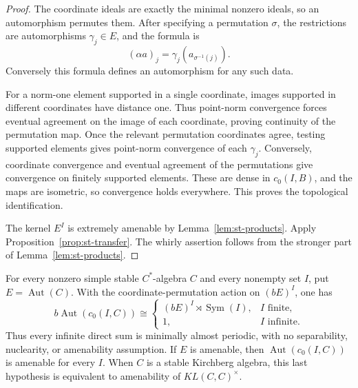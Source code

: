 \begin{proof}
The coordinate ideals are exactly the minimal nonzero ideals, so an
automorphism permutes them. After specifying a permutation $\sigma$, the
restrictions are automorphisms $\gamma_j\in E$, and the formula is 
\begin{equation}  \label{eq:st-sum-action}
(\alpha a)_j=\gamma_j(a_{\sigma^{-1}(j)}).
\end{equation}
Conversely this formula defines an automorphism for any such data.

For a norm-one element supported in a single coordinate, images supported in
different coordinates have distance one. Thus point-norm convergence forces
eventual agreement on the image of each coordinate, proving continuity of
the permutation map. Once the relevant permutation coordinates agree,
testing supported elements gives point-norm convergence of each $\gamma_j$.
Conversely, coordinate convergence and eventual agreement of the
permutations give convergence on finitely supported elements. These are
dense in $c_0(I,B)$, and the maps are isometric, so convergence holds
everywhere. This proves the topological identification.

The kernel $E^I$ is extremely amenable by Lemma~\ref{lem:st-products}. Apply
Proposition~\ref{prop:st-transfer}.
The whirly assertion follows from the stronger part of Lemma~\ref{lem:st-products}.
\end{proof}

\begin{corollary}\label{cor:st-direct-sum-bohr-general}
 For every nonzero simple stable $C^*$-algebra $C
$ and every nonempty set $I$, put $E=\operatorname{Aut}(C)$. With the
coordinate-permutation action on $(bE)^I$, one has 
\begin{equation*}
b\operatorname{Aut}(c_0(I,C))\cong  
\begin{cases}
(bE)^I\rtimes\operatorname{Sym}(I), & I\text{ finite}, \\ 
1, & I\text{ infinite}.\end{cases}
\end{equation*}
Thus every infinite direct sum is minimally almost periodic, with no
separability, nuclearity, or amenability assumption. If $E$ is
amenable, then $\operatorname{Aut}(c_0(I,C))$ is amenable for every $I$. When $C$ is a
stable Kirchberg algebra, this last hypothesis is equivalent to amenability
of $KL(C,C)^\times$.
\end{corollary}

